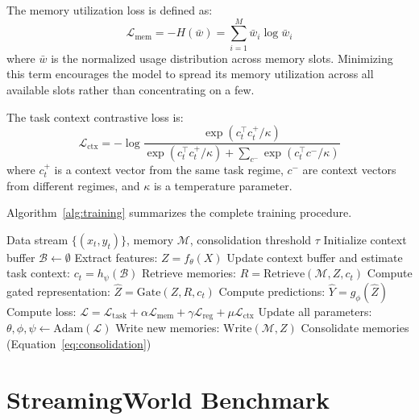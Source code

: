 \documentclass[11pt]{article}
\begin{document}
The memory utilization loss is defined as:
\begin{equation}
    \mathcal{L}_{\text{mem}} = -H(\bar{w}) = \sum_{i=1}^{M} \bar{w}_i \log \bar{w}_i
\end{equation}
where $\bar{w}$ is the normalized usage distribution across memory slots. Minimizing this term encourages the model to spread its memory utilization across all available slots rather than concentrating on a few.

The task context contrastive loss is:
\begin{equation}
    \mathcal{L}_{\text{ctx}} = -\log \frac{\exp(c_t^\top c_t^+ / \kappa)}{\exp(c_t^\top c_t^+ / \kappa) + \sum_{c^-} \exp(c_t^\top c^- / \kappa)}
\end{equation}
where $c_t^+$ is a context vector from the same task regime, $c^-$ are context vectors from different regimes, and $\kappa$ is a temperature parameter.

Algorithm~\ref{alg:training} summarizes the complete training procedure.

\begin{algorithm}
\caption{AMN Training Procedure}
\label{alg:training}
\begin{algorithmic}[1]
\REQUIRE Data stream $\{(x_t, y_t)\}$, memory $\mathcal{M}$, consolidation threshold $\tau$
\STATE Initialize context buffer $\mathcal{B} \leftarrow \emptyset$
    \STATE Extract features: $Z = f_\theta(X)$
    \STATE Update context buffer and estimate task context: $c_t = h_\psi(\mathcal{B})$
    \STATE Retrieve memories: $R = \text{Retrieve}(\mathcal{M}, Z, c_t)$
    \STATE Compute gated representation: $\hat{Z} = \text{Gate}(Z, R, c_t)$
    \STATE Compute predictions: $\hat{Y} = g_\phi(\hat{Z})$
    \STATE Compute loss: $\mathcal{L} = \mathcal{L}_{\text{task}} + \alpha \mathcal{L}_{\text{mem}} + \gamma \mathcal{L}_{\text{reg}} + \mu \mathcal{L}_{\text{ctx}}$
    \STATE Update all parameters: $\theta, \phi, \psi \leftarrow \text{Adam}(\mathcal{L})$
    \STATE Write new memories: $\text{Write}(\mathcal{M}, Z)$
        \STATE Consolidate memories (Equation~\ref{eq:consolidation})
    \ENDIF
\ENDFOR
\end{algorithmic}
\end{algorithm}

\section{StreamingWorld Benchmark}
\label{sec:benchmark}
\end{document}
